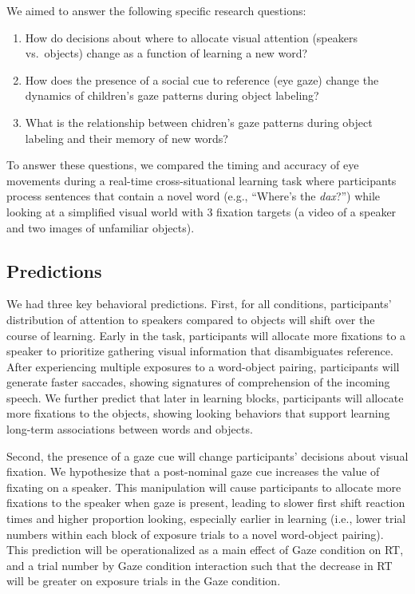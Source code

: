\documentclass[man,floatsintext]{apa6}
\providecommand{\tightlist}{%
  \setlength{\itemsep}{0pt}\setlength{\parskip}{0pt}}
\begin{document}
\noindent
We aimed to answer the following specific research questions:

\begin{enumerate}
\def\labelenumi{\arabic{enumi}.}
\tightlist
\item
  How do decisions about where to allocate visual attention (speakers
  vs.~objects) change as a function of learning a new word?
\item
  How does the presence of a social cue to reference (eye gaze) change
  the dynamics of children's gaze patterns during object labeling?
\item
  What is the relationship between chidren's gaze patterns during object
  labeling and their memory of new words?
\end{enumerate}

To answer these questions, we compared the timing and accuracy of eye
movements during a real-time cross-situational learning task where
participants process sentences that contain a novel word (e.g.,
\enquote{Where's the \emph{dax}?}) while looking at a simplified visual
world with 3 fixation targets (a video of a speaker and two images of
unfamiliar objects).

\subsection{Predictions}\label{predictions}

We had three key behavioral predictions. First, for all conditions,
participants' distribution of attention to speakers compared to objects
will shift over the course of learning. Early in the task, participants
will allocate more fixations to a speaker to prioritize gathering visual
information that disambiguates reference. After experiencing multiple
exposures to a word-object pairing, participants will generate faster
saccades, showing signatures of comprehension of the incoming speech. We
further predict that later in learning blocks, participants will
allocate more fixations to the objects, showing looking behaviors that
support learning long-term associations between words and objects.

Second, the presence of a gaze cue will change participants' decisions
about visual fixation. We hypothesize that a post-nominal gaze cue
increases the value of fixating on a speaker. This manipulation will
cause participants to allocate more fixations to the speaker when gaze
is present, leading to slower first shift reaction times and higher
proportion looking, especially earlier in learning (i.e., lower trial
numbers within each block of exposure trials to a novel word-object
pairing). This prediction will be operationalized as a main effect of
Gaze condition on RT, and a trial number by Gaze condition interaction
such that the decrease in RT will be greater on exposure trials in the
Gaze condition.
\end{document}
